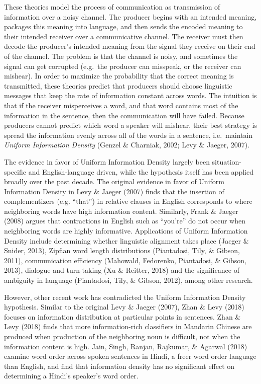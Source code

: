 \documentclass[10pt, letterpaper]{article}
\begin{document}
These theories model the process of communication as transmission of
information over a noisy channel. The producer begins with an intended
meaning, packages this meaning into language, and then sends the encoded
meaning to their intended receiver over a communicative channel. The
receiver must then decode the producer's intended meaning from the
signal they receive on their end of the channel. The problem is that the
channel is noisy, and sometimes the signal can get corrupted (e.g.~the
producer can misspeak, or the receiver can mishear). In order to
maximize the probability that the correct meaning is transmitted, these
theories predict that producers should choose linguistic messages that
keep the rate of information constant across words. The intuition is
that if the receiver misperceives a word, and that word contains most of
the information in the sentence, then the communication will have
failed. Because producers cannot predict which word a speaker will
mishear, their best strategy is spread the information evenly across all
of the words in a sentence, i.e.~maintain \emph{Uniform Information
Density} (Genzel \& Charniak, 2002; Levy \& Jaeger, 2007).

The evidence in favor of Uniform Information Density largely been
situation-specific and English-language driven, while the hypothesis
itself has been applied broadly over the past decade. The original
evidence in favor of Uniform Information Density in Levy \& Jaeger
(2007) finds that the insertion of complementizers (e.g. ``that'') in
relative clauses in English corresponds to where neighboring words have
high information content. Similarly, Frank \& Jaeger (2008) argues that
contractions in English such as ``you're'' do not occur when neighboring
words are highly informative. Applications of Uniform Information
Density include determining whether linguistic alignment takes place
(Jaeger \& Snider, 2013), Zipfian word length distributions (Piantadosi,
Tily, \& Gibson, 2011), communication efficiency (Mahowald, Fedorenko,
Piantadosi, \& Gibson, 2013), dialogue and turn-taking (Xu \& Reitter,
2018) and the significance of ambiguity in language (Piantadosi, Tily,
\& Gibson, 2012), among other research.

However, other recent work has contradicted the Uniform Information
Density hypothesis. Similar to the original Levy \& Jaeger (2007), Zhan
\& Levy (2018) focuses on information distribution at particular points
in sentences. Zhan \& Levy (2018) finds that more information-rich
classifiers in Mandarin Chinese are produced when production of the
neighboring noun is difficult, not when the information content is high.
Jain, Singh, Ranjan, Rajkumar, \& Agarwal (2018) examine word order
across spoken sentences in Hindi, a freer word order language than
English, and find that information density has no significant effect on
determining a Hindi's speaker's word order.
\end{document}
